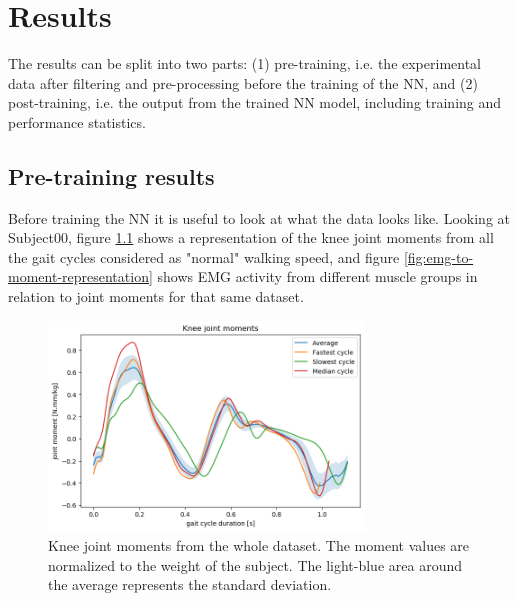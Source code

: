 \documentclass[../main.tex]{subfiles}
\begin{document}
\chapter{Results}
The results can be split into two parts: (1) pre-training, i.e. the experimental data after filtering and pre-processing before the training of the \ac{NN}, and (2) post-training, i.e. the output from the trained \ac{NN} model, including training and performance statistics.

\section{Pre-training results}
Before training the \ac{NN} it is useful to look at what the data looks like.
Looking at Subject00, figure \ref{fig:knee-joint-moments-stat} shows a representation of the knee joint moments from all the gait cycles considered as "normal" walking speed, and figure \ref{fig:emg-to-moment-representation} shows \ac{EMG} activity from different muscle groups in relation to joint moments for that same dataset.

\begin{figure}
    \centering
    \includegraphics[width=0.75\textwidth]{img/results/20190429_06_moments_normal_walk.png}
    \caption{Knee joint moments from the whole dataset. The moment values are normalized to the weight of the subject. The light-blue area around the average represents the standard deviation.}
    \label{fig:knee-joint-moments-stat}
\end{figure}
\end{document}
